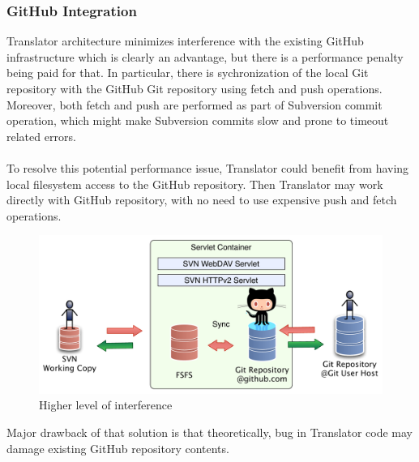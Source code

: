 \subsubsection{GitHub Integration}

Translator architecture minimizes interference with the existing GitHub infrastructure which is clearly an advantage, but there is a performance penalty being paid for that.
In particular, there is sychronization of the local Git repository with the GitHub Git repository using fetch and push operations. Moreover, both fetch and push are 
performed as part of Subversion commit operation, which might make Subversion commits slow and prone to timeout related errors.
\\\\
To resolve this potential performance issue, Translator could benefit from having local filesystem access to the GitHub repository. Then Translator may work directly with GitHub repository,
with no need to use expensive push and fetch operations.
\begin{figure}[!h]
\label{translator_components_pic2}
\includegraphics[width=\linewidth]{img/servlet/components_not_that_safe.pdf}
\caption{Higher level of interference}
\end{figure}
Major drawback of that solution is that theoretically, bug in Translator code may damage existing GitHub repository contents.